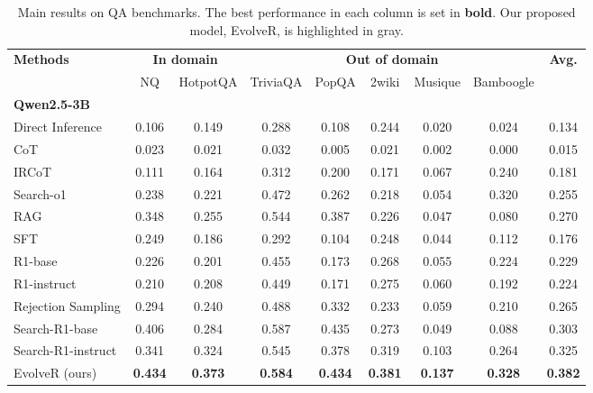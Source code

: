 \begin{table}[ht]
    \small
    \centering
    \setlength{\tabcolsep}{5pt}
    \caption{Main results on QA benchmarks. The best performance in each column is set in \textbf{bold}. Our proposed model, EvolveR, is highlighted in gray.}
    \label{tab:main_results}
    \begin{tabular}{l cc ccccc c} %
        \toprule
        \multirow{2}{*}{\textbf{Methods}}& \multicolumn{2}{c}{\textbf{In domain}} & \multicolumn{5}{c}{\textbf{Out of domain}} & \multirow{2}{*}{\textbf{Avg.}} \\
        \cmidrule(lr){2-3} \cmidrule(lr){4-8}
        & NQ & HotpotQA & TriviaQA & PopQA & 2wiki & Musique & Bamboogle & \\
        \midrule
        \multicolumn{9}{l}{\textbf{Qwen2.5-3B}} \\
        Direct Inference & 0.106 & 0.149 & 0.288 & 0.108 & 0.244 & 0.020 & 0.024 & 0.134 \\
        CoT & 0.023 & 0.021 & 0.032 & 0.005 & 0.021 & 0.002 & 0.000 & 0.015 \\
        IRCoT & 0.111 & 0.164 & 0.312 & 0.200 & 0.171 & 0.067 & 0.240 & 0.181 \\
        Search-o1 & 0.238 & 0.221 & 0.472 & 0.262 & 0.218 & 0.054 & 0.320 & 0.255 \\
        RAG & 0.348 & 0.255 & 0.544 & 0.387 & 0.226 & 0.047 & 0.080 & 0.270 \\
        SFT & 0.249 & 0.186 & 0.292 & 0.104 & 0.248 & 0.044 & 0.112 & 0.176 \\
        R1-base & 0.226 & 0.201 & 0.455 & 0.173 & 0.268 & 0.055 & 0.224 & 0.229 \\
        R1-instruct & 0.210 & 0.208 & 0.449 & 0.171 & 0.275 & 0.060 & 0.192 & 0.224 \\
        Rejection Sampling & 0.294 & 0.240 & 0.488 & 0.332 & 0.233 & 0.059 & 0.210 & 0.265 \\
        Search-R1-base & 0.406 & 0.284 & 0.587 & 0.435 & 0.273 & 0.049 & 0.088 & 0.303 \\
        Search-R1-instruct & 0.341 & 0.324 & 0.545 & 0.378 & 0.319 & 0.103 & 0.264 & 0.325 \\
        \rowcolor{Gray}
        EvolveR (ours) & \textbf{0.434} & \textbf{0.373} & \textbf{0.584} & \textbf{0.434} & \textbf{0.381} & \textbf{0.137} & \textbf{0.328} & \textbf{0.382} \\
        \bottomrule
    \end{tabular}
\end{table}

